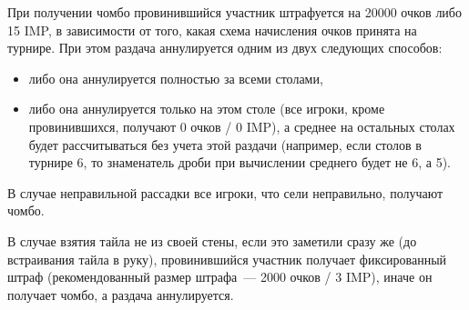 \begin{additional}
При получении чомбо провинившийся участник штрафуется на 20000 очков либо 15 IMP, в зависимости от того, какая схема начисления очков принята на турнире. При этом раздача аннулируется одним из двух следующих способов:

\begin{itemize}
	\item либо она аннулируется полностью за всеми столами,
	\item либо она аннулируется только на этом столе (все игроки, кроме провинившихся, получают 0 очков / 0 IMP), а среднее на остальных столах будет рассчитываться без учета этой раздачи (например, если столов в турнире 6, то знаменатель дроби при вычислении среднего будет не 6, а 5).
\end{itemize}

\vspace{0.3cm}

В случае неправильной рассадки все игроки, что сели неправильно, получают чомбо.

\vspace{0.3cm}

В случае взятия тайла не из своей стены, если это заметили сразу же (до встраивания тайла в руку), провинившийся участник получает фиксированный штраф (рекомендованный размер штрафа~--- 2000 очков / 3 IMP), иначе он получает чомбо, а раздача аннулируется.

\end{additional}
